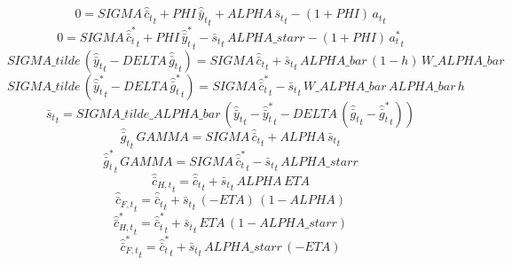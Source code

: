 \begin{dmath}
0={SIGMA}\, {{\hat {\bar c}_t}}_{t}+{PHI}\, {{\hat {\bar y}_t}}_{t}+{ALPHA}\, {{\bar s_t}}_{t}-\left(1+{PHI}\right)\, {{a_t}}_{t}
\end{dmath}
\begin{dmath}
0={SIGMA}\, {{\hat {\bar c}_t^*}}_{t}+{PHI}\, {{\hat {\bar y}_t^*}}_{t}-{{\bar s_t}}_{t}\, {ALPHA\_starr}-\left(1+{PHI}\right)\, {{a_t^*}}_{t}
\end{dmath}
\begin{dmath}
{SIGMA\_tilde}\, \left({{\hat {\bar y}_t}}_{t}-{DELTA}\, {{\hat {\bar g}_t}}_{t}\right)={SIGMA}\, {{\hat {\bar c}_t}}_{t}+{{\bar s_t}}_{t}\, {ALPHA\_bar}\, \left(1-{h}\right)\, {W\_ALPHA\_bar}
\end{dmath}
\begin{dmath}
{SIGMA\_tilde}\, \left({{\hat {\bar y}_t^*}}_{t}-{DELTA}\, {{\hat {\bar g}_t^*}}_{t}\right)={SIGMA}\, {{\hat {\bar c}_t^*}}_{t}-{{\bar s_t}}_{t}\, {W\_ALPHA\_bar}\, {ALPHA\_bar}\, {h}
\end{dmath}
\begin{dmath}
{{\bar s_t}}_{t}={SIGMA\_tilde\_ALPHA\_bar}\, \left({{\hat {\bar y}_t}}_{t}-{{\hat {\bar y}_t^*}}_{t}-{DELTA}\, \left({{\hat {\bar g}_t}}_{t}-{{\hat {\bar g}_t^*}}_{t}\right)\right)
\end{dmath}
\begin{dmath}
{{\hat {\bar g}_t}}_{t}\, {GAMMA}={SIGMA}\, {{\hat {\bar c}_t}}_{t}+{ALPHA}\, {{\bar s_t}}_{t}
\end{dmath}
\begin{dmath}
{{\hat {\bar g}_t^*}}_{t}\, {GAMMA}={SIGMA}\, {{\hat {\bar c}_t^*}}_{t}-{{\bar s_t}}_{t}\, {ALPHA\_starr}
\end{dmath}
\begin{dmath}
{{\hat {\bar c}_{H,t}}}_{t}={{\hat {\bar c}_t}}_{t}+{{\bar s_t}}_{t}\, {ALPHA}\, {ETA}
\end{dmath}
\begin{dmath}
{{\hat {\bar c}_{F,t}}}_{t}={{\hat {\bar c}_t}}_{t}+{{\bar s_t}}_{t}\, \left(-{ETA}\right)\, \left(1-{ALPHA}\right)
\end{dmath}
\begin{dmath}
{{\hat {\bar c}_{H,t}^*}}_{t}={{\hat {\bar c}_t^*}}_{t}+{{\bar s_t}}_{t}\, {ETA}\, \left(1-{ALPHA\_starr}\right)
\end{dmath}
\begin{dmath}
{{\hat {\bar c}_{F,t}^*}}_{t}={{\hat {\bar c}_t^*}}_{t}+{{\bar s_t}}_{t}\, {ALPHA\_starr}\, \left(-{ETA}\right)
\end{dmath}
